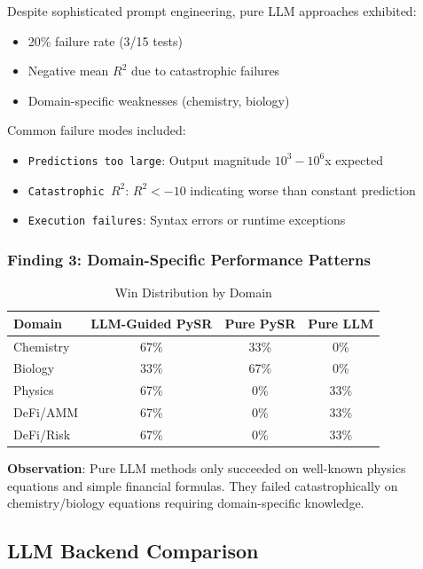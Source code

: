 \documentclass[11pt,a4paper]{article}
\begin{document}
Despite sophisticated prompt engineering, pure LLM approaches exhibited:
\begin{itemize}
    \item 20\% failure rate (3/15 tests)
    \item Negative mean $R^2$ due to catastrophic failures
    \item Domain-specific weaknesses (chemistry, biology)
\end{itemize}

Common failure modes included:
\begin{itemize}
    \item \texttt{Predictions too large}: Output magnitude $10^3-10^6$x expected
    \item \texttt{Catastrophic $R^2$}: $R^2 < -10$ indicating worse than constant prediction
    \item \texttt{Execution failures}: Syntax errors or runtime exceptions
\end{itemize}

\subsubsection{Finding 3: Domain-Specific Performance Patterns}

\begin{table}[h]
\centering
\caption{Win Distribution by Domain}
\begin{tabular}{lccc}
\toprule
\textbf{Domain} & \textbf{LLM-Guided PySR} & \textbf{Pure PySR} & \textbf{Pure LLM} \\
\midrule
Chemistry & 67\% & 33\% & 0\% \\
Biology & 33\% & 67\% & 0\% \\
Physics & 67\% & 0\% & 33\% \\
DeFi/AMM & 67\% & 0\% & 33\% \\
DeFi/Risk & 67\% & 0\% & 33\% \\
\bottomrule
\end{tabular}
\end{table}

\textbf{Observation}: Pure LLM methods only succeeded on well-known physics equations and simple financial formulas. They failed catastrophically on chemistry/biology equations requiring domain-specific knowledge.

\subsection{LLM Backend Comparison}
\end{document}
